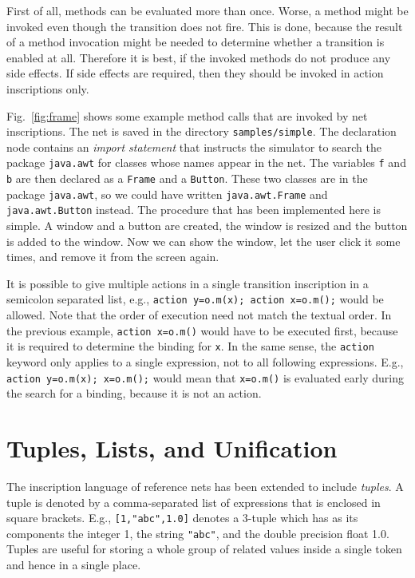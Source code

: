 First of all, methods can be evaluated more than once. Worse,
a method might be invoked even though the transition does not fire.
This is done, because the result of a method invocation might
be needed to determine whether a transition is enabled at all.
Therefore it is best, if the invoked methods do not produce
any side effects.
If side effects are required, then they should be
invoked in action inscriptions only.


Fig.~\ref{fig:frame} shows some example method calls that
are invoked by net inscriptions.
The net is saved in the directory \texttt{samples/simple}.
The declaration node contains an \emph{import statement}
that instructs the simulator to search the package \texttt{java.awt}
for classes whose names appear in the net. The variables
\texttt{f} and \texttt{b} are then declared as a \texttt{Frame}
and a \texttt{Button}. These two classes are
in the package \texttt{java.awt}, so we could have written
\texttt{java.awt.Frame} and \texttt{java.awt.Button} instead.
The procedure that has been implemented here is simple.
A window and a button are created, the window is resized
and the button is added to the window. Now we can show the window,
let the user click it some times, and remove it from the screen
again.

It is possible to give multiple actions in a single transition
inscription in a semicolon separated list, e.g.,
\texttt{action y=o.m(x); action x=o.m();} would be allowed.
Note that the order of execution need not match the textual
order. In the previous example, \texttt{action x=o.m()} would
have to be executed first, because it is required to determine
the binding for \texttt{x}. In the same sense, the \texttt{action}
keyword only applies to a single expression, not to all following
expressions. E.g., \texttt{action y=o.m(x); x=o.m();} would
mean that \texttt{x=o.m()} is evaluated early during the
search for a binding, because it is not an action.

\section{Tuples, Lists, and Unification}
\label{sec:tuplist}

The inscription language of reference nets has been extended
to include \emph{tuples}. A tuple is denoted by a comma-separated list
of expressions that is enclosed in square brackets. E.g.,
\texttt{[1,"abc",1.0]} denotes a 3-tuple which has as its
components the integer 1, the string \texttt{"abc"}, and
the double precision float 1.0. Tuples are useful for storing
a whole group of related values inside a single token
and hence in a single place.

